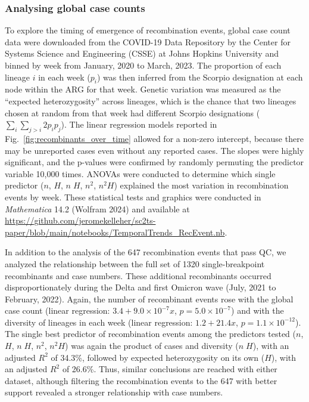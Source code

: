 \documentclass[12pt]{article}
\newcommand{\figref}[1]{Fig.~\ref{#1}}
\begin{document}
\subsubsection*{Analysing global case counts}
To explore the timing of emergence of recombination events,
global case count data were downloaded from
the COVID-19 Data Repository by the Center
for Systems Science and Engineering (CSSE)
at Johns Hopkins University \cite{Dong2020} and
binned by week from January, 2020 to March, 2023.
The proportion of each lineage $i$ in each week ($p_i$)
was then inferred from the Scorpio designation
at each node within the ARG for that week.
Genetic variation was measured
as the ``expected heterozygosity'' across lineages,
which is the chance that two lineages chosen at random
from that week had different Scorpio designations
($\sum_{i} \sum_{j>i} 2 p_i p_j$).
The linear regression models reported in
\figref{fig:recombinants_over_time}
allowed for a non-zero intercept,
because there may be unreported cases even without any reported cases.
The slopes were highly significant, and
the p-values were confirmed
by randomly permuting the predictor variable 10,000 times.
ANOVAs were conducted to determine which single predictor
($n$, $H$, $n \; H$, $n^2$, $n^2 H$)
explained the most variation in recombination events by week.
These statistical tests and graphics were conducted
in \textit{Mathematica} 14.2 (Wolfram 2024) and
available at
\url{https://github.com/jeromekelleher/sc2ts-paper/blob/main/notebooks/TemporalTrends\_RecEvent.nb}.

In addition to the analysis of the 647 recombination events that pass QC,
we analyzed the relationship between the full set of 1320 single-breakpoint recombinants and case numbers.
These additional recombinants occurred disproportionately
during the Delta and first Omicron wave (July, 2021 to February, 2022).
Again, the number of recombinant events rose with the global case count
(linear regression: $3.4 + 9.0\times10^{-7} x$, $p = 5.0\times10^{-7}$)
and with the diversity of lineages in each week
(linear regression: $1.2 + 21.4 x$, $p = 1.1\times10^{-12}$).
The single best predictor of recombination events
among the predictors tested ($n$, $H$, $n \; H$, $n^2$, $n^2 H$)
was again the product of cases and diversity ($n \; H$),
with an adjusted $R^2$ of 34.3\%,
followed by expected heterozygosity on its own ($H$),
with an adjusted $R^2$ of 26.6\%.
Thus, similar conclusions are reached with either dataset,
although filtering the recombination events to the 647
with better support revealed a stronger relationship with case numbers.
\end{document}
